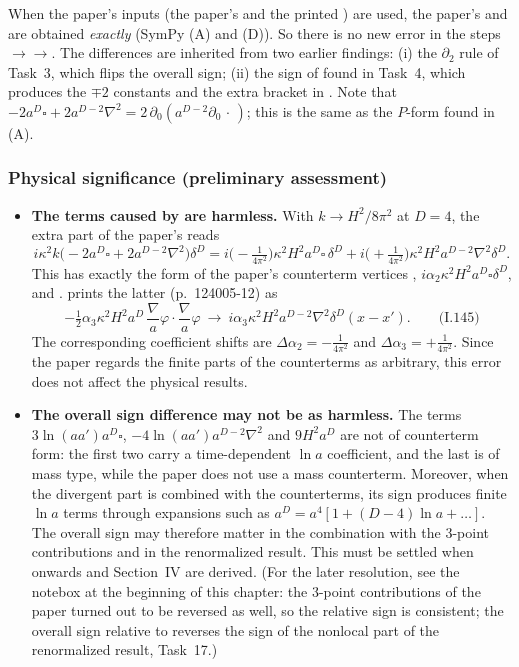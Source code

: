 \begin{discbox}[Diagnosis]
When the paper's inputs (the paper's  and the printed ) are used, the paper's
 and  are obtained \emph{exactly} (SymPy (A) and (D)). So there is no new error
in the steps \(\to\)\(\to\). The differences are inherited from two
earlier findings:
(i) the \(\partial_2\) rule of Task~3, which flips the overall sign;
(ii) the sign of  found in Task~4, which produces the \(\mp2\) constants and the extra
bracket in .
Note that \(-2a^D\square+2a^{D-2}\nabla^2=2\,\partial_0(a^{D-2}\partial_0\,\cdot\,)\); this is the same as
the \(P\)-form found in (A).
\end{discbox}

\subsubsection{Physical significance (preliminary assessment) \texorpdfstring{\tA}{}}\label{sec:t5-phys}
\begin{itemize}
\item \textbf{The terms caused by  are harmless.} With \(k\to H^2/8\pi^2\) at \(D=4\), the
extra part of the paper's  reads
\begin{equation*}
i\kappa^2k\bigl(-2a^D\square+2a^{D-2}\nabla^2\bigr)\delta^D
=i\bigl(-\tfrac1{4\pi^2}\bigr)\kappa^2H^2a^D\square\,\delta^D+i\bigl(+\tfrac1{4\pi^2}\bigr)\kappa^2H^2a^{D-2}\nabla^2\delta^D .
\end{equation*}
This has exactly the form of the paper's counterterm vertices ,
\(i\alpha_2\kappa^2H^2a^D\square\delta^D\), and . \PI{} prints the latter
(p.~124005-12) as
\begin{equation*}
-\tfrac12\alpha_3\kappa^2H^2a^D\,\frac{\nabla}{a}\varphi\cdot\frac{\nabla}{a}\varphi\ \to\ i\alpha_3\kappa^2H^2a^{D-2}\nabla^2\delta^D(x-x').
\qquad\text{(I.145)}
\end{equation*}
The corresponding coefficient shifts are \(\Delta\alpha_2=-\tfrac1{4\pi^2}\) and
\(\Delta\alpha_3=+\tfrac1{4\pi^2}\). Since the paper regards the finite parts of the counterterms
as arbitrary, this error does not affect the physical results.
\item \textbf{The overall sign difference may not be as harmless.} The terms
\(3\ln(aa')a^D\square\), \(-4\ln(aa')a^{D-2}\nabla^2\) and \(9H^2a^D\) are not of counterterm form:
the first two carry a time-dependent \(\ln a\) coefficient, and the last is of mass type,
while the paper does not use a mass counterterm. Moreover, when the divergent part is combined
with the counterterms, its sign produces finite \(\ln a\) terms through expansions such as
\(a^D=a^4[1+(D-4)\ln a+\ldots]\). The overall sign may therefore matter in the combination with
the 3-point contributions and in the renormalized result. This must be settled when
 onwards and Section~IV are derived. (For the later resolution, see the notebox at the
beginning of this chapter: the 3-point contributions of the paper turned out to be reversed as
well, so the relative sign is consistent; the overall sign relative to  reverses the
sign of the nonlocal part of the renormalized result, Task~17.)
\end{itemize}

